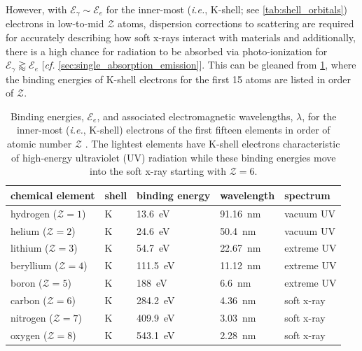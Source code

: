 However, with $\mathcal{E}_{\gamma} \sim \mathcal{E}_e$ for the inner-most (\emph{i.e.}, K-shell; see \cref{tab:shell_orbitals}) electrons in low-to-mid $\mathcal{Z}$ atoms, dispersion corrections to scattering are required for accurately describing how soft x-rays interact with materials and additionally, there is a high chance for radiation to be absorbed via photo-ionization for $\mathcal{E}_{\gamma} \gtrapprox \mathcal{E}_e$ [\emph{cf.\@} \cref{sec:single_absorption_emission}]. 
This can be gleaned from \cref{tab:first_element_binding}, where the binding energies of K-shell electrons for the first \num{15} atoms are listed in order of $\mathcal{Z}$. 
\begin{table}[]
 \centering
 \caption[Binding energies for the inner-most electrons of the first fifteen elements in order of atomic number]{Binding energies, $\mathcal{E}_e$, and associated electromagnetic wavelengths, $\lambda$, for the inner-most (\emph{i.e.}, K-shell) electrons of the first fifteen elements in order of atomic number $\mathcal{Z}$ \cite{Attwood17}. The lightest elements have K-shell electrons characteristic of high-energy ultraviolet (UV) radiation while these binding energies move into the soft x-ray starting with $\mathcal{Z}=6$.}\label{tab:first_element_binding}
 \begin{tabular}{@{}lllll@{}} 
 \toprule
 chemical element & shell & binding energy & wavelength & spectrum \\ \midrule
 hydrogen ($\mathcal{Z}=1$) & K & \SI{13.6}{\electronvolt} & \SI{91.16}{\nano\metre} & vacuum UV \\
 helium ($\mathcal{Z}=2$) & K & \SI{24.6}{\electronvolt} & \SI{50.4}{\nano\metre} & vacuum UV \\
 lithium ($\mathcal{Z}=3$) & K & \SI{54.7}{\electronvolt} & \SI{22.67}{\nano\metre} & extreme UV \\
 beryllium ($\mathcal{Z}=4$) & K & \SI{111.5}{\electronvolt} & \SI{11.12}{\nano\metre} & extreme UV \\
 boron ($\mathcal{Z}=5$) & K & \SI{188}{\electronvolt} & \SI{6.6}{\nano\metre} & extreme UV \\
 carbon ($\mathcal{Z}=6$) & K & \SI{284.2}{\electronvolt} & \SI{4.36}{\nano\metre} & soft x-ray \\
 nitrogen ($\mathcal{Z}=7$) & K & \SI{409.9}{\electronvolt} & \SI{3.03}{\nano\metre} & soft x-ray \\
 oxygen ($\mathcal{Z}=8$) & K & \SI{543.1}{\electronvolt} & \SI{2.28}{\nano\metre} & soft x-ray \\

\end{tabular}
\end{table}
